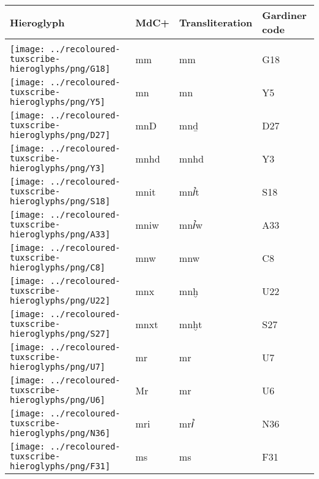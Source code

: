 \begin{center}
	\begin{tabularx}{\linewidth}{YYYY}
		Hieroglyph & MdC+ & Transliteration & Gardiner code\\
		\hline\\
		\texttt{[image: ../recoloured-tuxscribe-hieroglyphs/png/G18]} & mm & mm & G18 \\ 
		\texttt{[image: ../recoloured-tuxscribe-hieroglyphs/png/Y5]} & mn & mn & Y5 \\ 
		\texttt{[image: ../recoloured-tuxscribe-hieroglyphs/png/D27]} & mnD & mnḏ & D27 \\ 
		\texttt{[image: ../recoloured-tuxscribe-hieroglyphs/png/Y3]} & mnhd & mnhd & Y3 \\ 
		\texttt{[image: ../recoloured-tuxscribe-hieroglyphs/png/S18]} & mnit & mnꞽt & S18 \\ 
		\texttt{[image: ../recoloured-tuxscribe-hieroglyphs/png/A33]} & mniw & mnꞽw & A33 \\ 
		\texttt{[image: ../recoloured-tuxscribe-hieroglyphs/png/C8]} & mnw & mnw & C8 \\ 
		\texttt{[image: ../recoloured-tuxscribe-hieroglyphs/png/U22]} & mnx & mnḫ & U22 \\ 
		\texttt{[image: ../recoloured-tuxscribe-hieroglyphs/png/S27]} & mnxt & mnḫt & S27 \\ 
		\texttt{[image: ../recoloured-tuxscribe-hieroglyphs/png/U7]} & mr & mr & U7 \\ 
		\texttt{[image: ../recoloured-tuxscribe-hieroglyphs/png/U6]} & Mr & mr & U6 \\ 
		\texttt{[image: ../recoloured-tuxscribe-hieroglyphs/png/N36]} & mri & mrꞽ & N36 \\ 
		\texttt{[image: ../recoloured-tuxscribe-hieroglyphs/png/F31]} & ms & ms & F31 \\ 
	\end{tabularx}
\end{center}


